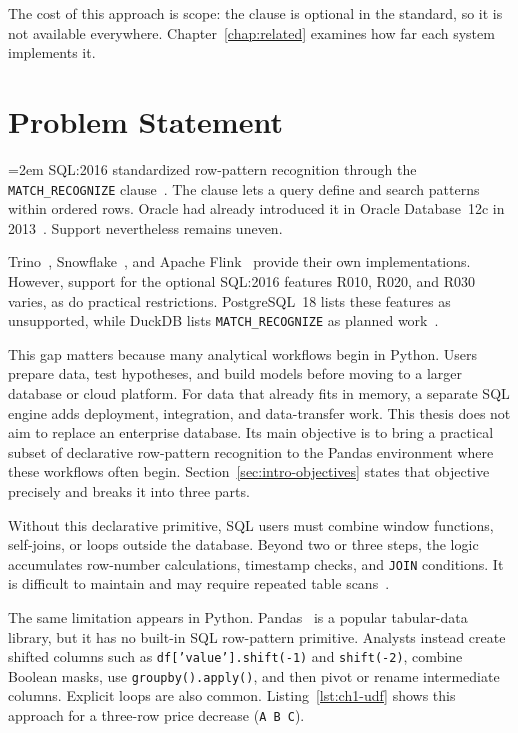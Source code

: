 The cost of this approach is scope: the clause is optional in the standard,
so it is not available everywhere.  Chapter~\ref{chap:related} examines how
far each system implements it.

\section{Problem Statement}
\label{sec:intro-problem}
\begingroup\emergencystretch=2em
SQL:2016 standardized row-pattern recognition through the
\texttt{MATCH\_RECOGNIZE} clause~\cite{iso2016,ISO2021}.  The clause lets a
query define and search patterns within ordered rows.  Oracle had already
introduced it in Oracle Database~12c in 2013~\cite{OracleMR,
oracle2021dwhsg,book}.
Support nevertheless remains uneven.\par\endgroup

Trino~\cite{trino2022,trino2021row},
Snowflake~\cite{snowflake2025match_recognize}, and Apache
Flink~\cite{flink} provide their own implementations.  However, support for
the optional SQL:2016 features R010, R020, and R030 varies, as do practical
restrictions.  PostgreSQL~18 lists these features as unsupported, while
DuckDB lists \texttt{MATCH\_RECOGNIZE} as planned work~\cite{
postgresql18unsupported,duckdb2026roadmap}.

This gap matters because many analytical workflows begin in Python.  Users
prepare data, test hypotheses, and build models before moving to a larger
database or cloud platform.  For data that already fits in memory, a separate
SQL engine adds deployment, integration, and data-transfer work.  This thesis
does not aim to replace an enterprise database.  Its main objective is to
bring a practical subset of declarative row-pattern recognition to the Pandas
environment where these workflows often begin.  Section~\ref{sec:intro-objectives}
states that objective precisely and breaks it into three parts.

Without this declarative primitive, SQL users must combine window functions,
self-joins, or loops outside the database.  Beyond two or three steps, the
logic accumulates row-number calculations, timestamp checks, and
\texttt{JOIN} conditions.  It is difficult to maintain and may require
repeated table scans~\cite{cao2012optimizationanalyticwindowfunctions}.

The same limitation appears in Python.  Pandas~\cite{McKinney2010} is a
popular tabular-data library, but it has no built-in SQL row-pattern
primitive.  Analysts instead create shifted columns such as
\texttt{df['value'].shift(-1)} and \texttt{shift(-2)}, combine Boolean masks,
use \texttt{groupby().apply()}, and then pivot or rename intermediate
columns.  Explicit loops are also common.  Listing~\ref{lst:ch1-udf} shows
this approach for a three-row price decrease (\texttt{A~B~C}).

